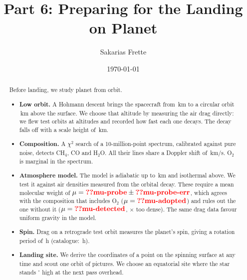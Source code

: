 \documentclass[aps,prd,twocolumn,nofootinbib,floatfix,superscriptaddress]{revtex4-2}
\begin{document}
\title{Part 6: Preparing for the Landing on Planet }
\author{Sakarias Frette}
\date{\today}

\begin{abstract}
Before landing, we study planet  from orbit.
\begin{itemize}
\item \textbf{Low orbit.} A Hohmann descent brings the spacecraft from \,km to a circular orbit \,km above the surface. We choose that altitude by measuring the air drag directly: we flew test orbits at  altitudes and recorded how fast each one decays. The decay falls off with a scale height of \,km.
\item \textbf{Composition.} A $\chi^2$ search of a 10-million-point spectrum, calibrated against pure noise, detects CH$_4$, CO and H$_2$O. All their lines share a Doppler shift of \,km/s. O$_2$ is marginal in the spectrum.
\item \textbf{Atmosphere model.} The model is adiabatic up to \,km and isothermal above. We test it against air densities measured from the orbital decay. These require a mean molecular weight of $\mu=\val{mu-probe}\pm\val{mu-probe-err}$, which agrees with the composition that includes O$_2$ ($\mu=\val{mu-adopted}$) and rules out the one without it ($\mu=\val{mu-detected}$, $\times$ too dense). The same drag data favour uniform gravity in the model.
\item \textbf{Spin.} Drag on a retrograde test orbit measures the planet's spin, giving a rotation period of \,h (catalogue: \,h).
\item \textbf{Landing site.} We derive the coordinates of a point on the spinning surface at any time and scout one orbit of pictures. We choose an equatorial site where the star stands $^\circ$ high at the next pass overhead.
\end{itemize}
\end{abstract}

\maketitle

\end{document}
